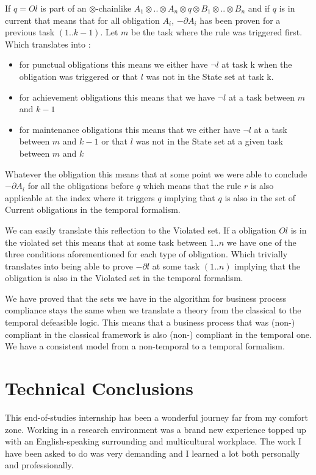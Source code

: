 \documentclass[10pt]{report}
\newcommand{\ochain}{$\otimes$-chain}
\begin{document}
If $q=Ol$ is part of an \ochain like $A_{1}\otimes .. \otimes A_{n} \otimes q \otimes B_{1} \otimes .. \otimes B_{n}$ and if $q$ is in current that means that for all obligation $A_{i}$, $-\partial A_{i}$ has been proven for a previous task $(1..k-1)$. Let $m$ be the task where the rule was triggered first. Which translates into :
\begin{itemize}
\item for punctual obligations this means we either have $\neg l$ at task k when the obligation was triggered or that $l$ was not in the State set at task k.
\item for achievement obligations this means that we have $\neg l$ at a task between $m$ and $k-1$
\item for maintenance obligations this means that we either have $\neg l$ at a task between $m$ and $k-1$ or that $l$ was not in the State set at a given task between $m$ and $k$ 
\end{itemize}

Whatever the obligation this means that at some point we were able to conclude $-\partial A_{i}$ for all the obligations before $q$ which means that the rule $r$ is also applicable at the index where it triggers $q$ implying that $q$ is also in the set of Current obligations in the temporal formalism.

We can easily translate this reflection to the Violated set. If a obligation $Ol$ is in the violated set this means that at some task between $1..n$ we have one of the three conditions aforementioned for each type of obligation. Which trivially translates into being able to prove $-\partial l$ at some task $(1..n)$ implying that the obligation is also in the Violated set in the temporal formalism.

We have proved that the sets we have in the algorithm for business process compliance stays the same when we translate a theory from the classical to the temporal defeasible logic. This means that a business process that was (non-) compliant in the classical framework is also (non-) compliant in the temporal one. We have a consistent model from a non-temporal to a temporal formalism.

\section*{Technical Conclusions}
This end-of-studies internship has been a wonderful journey far from my comfort zone. Working in a research environment was a brand new experience topped up with an English-speaking surrounding and multicultural workplace. The work I have been asked to do was very demanding and I learned a lot both personally and professionally.
\end{document}
